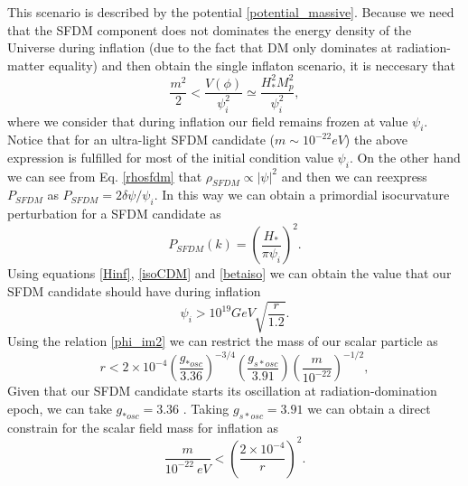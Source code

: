 \documentclass[amssymb,twocolumn,prd,nofootinbib,showpacs]{revtex4-1}
\begin{document}
This scenario is described by the potential \eqref{potential_massive}. Because we need that the SFDM component does not dominates the energy density of the Universe during inflation (due to the fact that DM only dominates at radiation-matter equality) and then obtain the single inflaton scenario, it is neccesary that 
\begin{equation}
\frac{m^2}{2} < \frac{V(\phi)}{\psi_i^2}\simeq \frac{H^2_{*}M_p^2}{\psi_i^2},
\end{equation}
where we consider that during inflation our field remains frozen  at value $\psi_i$. Notice that for an ultra-light SFDM candidate  ($m\sim 10^{-22}eV$) the above expression is fulfilled for most of the initial condition value $\psi_i$. On the other hand we can see from Eq. \eqref{rhosfdm} that $\rho_{SFDM}\propto |\psi|^2$ and then we can reexpress $P_{SFDM}$ as 
$P_{SFDM} = 2\delta \psi/\psi_i
$. In this way we can obtain a primordial isocurvature perturbation for a SFDM candidate as
\begin{equation}
P_{SFDM}(k)=\left(\frac{H_*}{\pi \psi_i}\right)^2.
\end{equation}
Using equations  \eqref{Hinf}, \eqref{isoCDM} and \eqref{betaiso} we can obtain the value that our SFDM candidate should have during inflation
\begin{equation}\label{initial_c}
\psi_i>10^{19}GeV\sqrt{\frac{r}{1.2}}.
\end{equation}
Using the relation \eqref{phi_im2} we can restrict the mass of our scalar particle as  
\begin{equation}
r<2\times 10^{-4}\left(\frac{g_{*osc}}{3.36}\right)^{-3/4}\left(\frac{g_{s*osc}}{3.91}\right)\left(\frac{m}{10^{-22}}\right)^{-1/2},
\end{equation}
Given that our SFDM candidate starts its oscillation at radiation-domination epoch, we can take $g_{*osc}=3.36$ \cite{effdeg}. Taking $g_{s*osc}=3.91$ we can obtain a direct constrain for the scalar field mass for inflation as 
\begin{equation}\label{constm}
\frac{m}{10^{-22}\ eV}<\left(\frac{2\times 10^{-4}}{r}\right)^2.
\end{equation}
\end{document}
